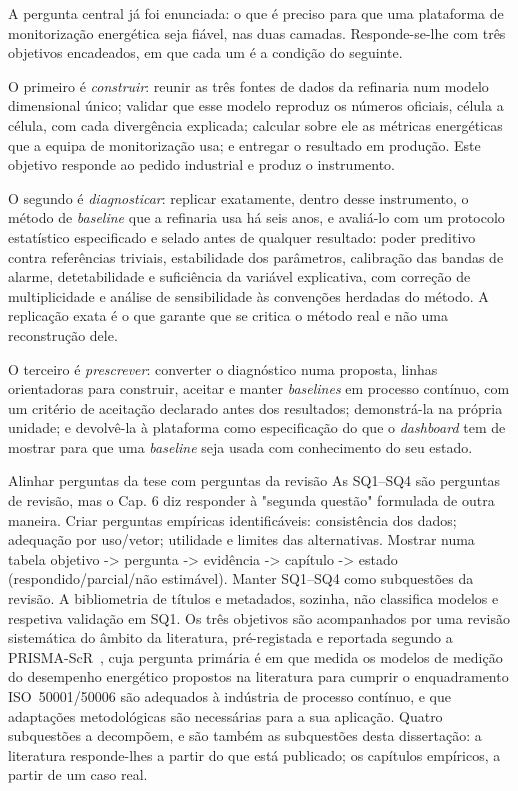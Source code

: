 A pergunta central já foi enunciada: o que é preciso para que uma
plataforma de monitorização energética seja fiável, nas duas camadas.
Responde-se-lhe com três objetivos encadeados, em que cada um é a
condição do seguinte.

O primeiro é \emph{construir}: reunir as três fontes de dados da
refinaria num modelo dimensional único; validar que esse modelo
reproduz os números oficiais, célula a célula, com cada divergência
explicada; calcular sobre ele as métricas energéticas que a equipa de
monitorização usa; e entregar o resultado em produção. Este objetivo
responde ao pedido industrial e produz o instrumento.

O segundo é \emph{diagnosticar}: replicar exatamente, dentro desse
instrumento, o método de \emph{baseline} que a refinaria usa há seis
anos, e avaliá-lo com um protocolo estatístico especificado e selado
antes de qualquer resultado: poder preditivo contra referências
triviais, estabilidade dos parâmetros, calibração das bandas de alarme,
detetabilidade e suficiência da variável explicativa, com correção de
multiplicidade e análise de sensibilidade às convenções herdadas do
método. A replicação exata é o que garante que se critica o método real
e não uma reconstrução dele.

O terceiro é \emph{prescrever}: converter o diagnóstico numa proposta,
linhas orientadoras para construir, aceitar e manter \emph{baselines}
em processo contínuo, com um critério de aceitação declarado antes dos
resultados; demonstrá-la na própria unidade; e devolvê-la à plataforma como especificação do que o \emph{dashboard}
tem de mostrar para que uma \emph{baseline} seja usada com conhecimento
do seu estado.

{Alinhar perguntas da tese com perguntas da revisão}
{As SQ1--SQ4 são perguntas de revisão, mas o Cap. 6 diz responder à
"segunda questão" formulada de outra maneira. Criar perguntas empíricas
identificáveis: consistência dos dados; adequação por uso/vetor; utilidade
e limites das alternativas. Mostrar numa tabela objetivo -\textgreater{} pergunta -\textgreater{}
evidência -\textgreater{} capítulo -\textgreater{} estado (respondido/parcial/não estimável).
Manter SQ1--SQ4 como subquestões da revisão. A bibliometria de títulos e
metadados, sozinha, não classifica modelos e respetiva validação em SQ1.}%
Os três objetivos são acompanhados por uma revisão sistemática do
âmbito da literatura, pré-registada e reportada segundo a
PRISMA-ScR~\cite{Tricco2018}, cuja pergunta primária
é em que medida os modelos de medição do desempenho energético
propostos na literatura para cumprir o enquadramento ISO~50001/50006
são adequados à indústria de processo contínuo, e que adaptações
metodológicas são necessárias para a sua aplicação. Quatro subquestões
a decompõem, e são também as subquestões desta dissertação: a
literatura responde-lhes a partir do que está publicado; os capítulos
empíricos, a partir de um caso real.

